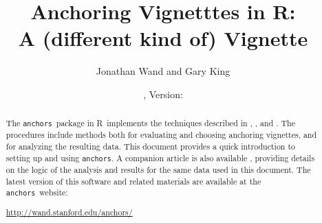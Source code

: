 \documentclass{amsart}
\title{Anchoring Vignetttes in R:\\ A (different kind of) Vignette}
\author{Jonathan Wand and Gary King}
\date{\AnchorsDate, Version: \AnchorsVer}
\newcommand{\Rpackage}[1]{{\texttt{#1}}}
\newcommand{\R}{{\normalfont\textsf{R}}{}}
\newcommand{\Ranchors}{{\texttt{anchors}}}
\begin{document}
\begin{abstract}
The \Ranchors\ package in \R\ implements the techniques
described in \cite{king:2004}, \cite{king.wand:2007}, and
\cite{wand:2007}.  The procedures include methods both for evaluating
and choosing anchoring vignettes, and for analyzing the resulting
data.  This document provides a quick introduction to setting up and
using \Ranchors.  A companion article is also available
\citep{wand.ea:2007}, providing details on the logic of the analysis
and results for the same data used in this document. The latest
version of this software and related materials are available at the
\Ranchors\ website:
\begin{center}
\url{http://wand.stanford.edu/anchors/}
\end{center}
\end{abstract}

\maketitle

\pagestyle{myheadings}


% 
% 
\end{document}
